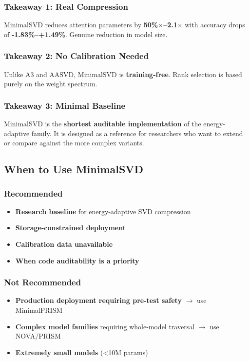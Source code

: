 \subsubsection{Takeaway 1: Real Compression}

MinimalSVD reduces attention parameters by \textbf{50\%$\times$--2.1$\times$} with 
accuracy drops of \textbf{-1.83\%--+1.49\%}. Genuine reduction in model 
size.

\subsubsection{Takeaway 2: No Calibration Needed}

Unlike A3 and AASVD, MinimalSVD is \textbf{training-free}. Rank selection is based 
purely on the weight spectrum.

\subsubsection{Takeaway 3: Minimal Baseline}

MinimalSVD is the \textbf{shortest auditable implementation} of the energy-adaptive 
family. It is designed as a reference for researchers who want to extend or 
compare against the more complex variants.

\subsection{When to Use MinimalSVD}

\subsubsection{Recommended}

\begin{itemize}
\item \textbf{Research baseline} for energy-adaptive SVD compression
\item \textbf{Storage-constrained deployment}
\item \textbf{Calibration data unavailable}
\item \textbf{When code auditability is a priority}

\end{itemize}
\subsubsection{Not Recommended}

\begin{itemize}
\item \textbf{Production deployment requiring pre-test safety} $\to$ use MinimalPRISM
\item \textbf{Complex model families} requiring whole-model traversal $\to$ use NOVA/PRISM
\item \textbf{Extremely small models} (\textless{}10M params)

\end{itemize}

